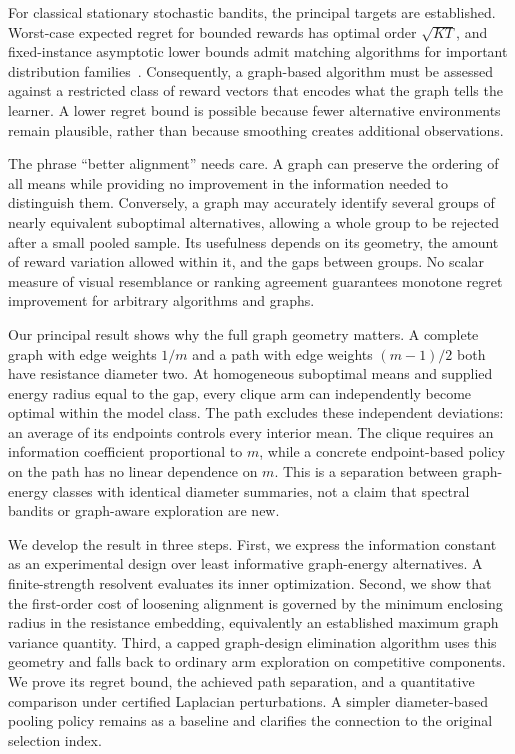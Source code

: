 \documentclass[11pt]{article}
\begin{document}
For classical stationary stochastic bandits, the principal targets are established. Worst-case expected regret for bounded rewards has optimal order $\sqrt{KT}$, and fixed-instance asymptotic lower bounds admit matching algorithms for important distribution families~\cite{audibert2010,garivier2011,lattimore2020}. Consequently, a graph-based algorithm must be assessed against a restricted class of reward vectors that encodes what the graph tells the learner. A lower regret bound is possible because fewer alternative environments remain plausible, rather than because smoothing creates additional observations.

The phrase ``better alignment'' needs care. A graph can preserve the ordering of all means while providing no improvement in the information needed to distinguish them. Conversely, a graph may accurately identify several groups of nearly equivalent suboptimal alternatives, allowing a whole group to be rejected after a small pooled sample. Its usefulness depends on its geometry, the amount of reward variation allowed within it, and the gaps between groups. No scalar measure of visual resemblance or ranking agreement guarantees monotone regret improvement for arbitrary algorithms and graphs.

Our principal result shows why the full graph geometry matters. A complete graph with edge weights $1/m$ and a path with edge weights $(m-1)/2$ both have resistance diameter two. At homogeneous suboptimal means and supplied energy radius equal to the gap, every clique arm can independently become optimal within the model class. The path excludes these independent deviations: an average of its endpoints controls every interior mean. The clique requires an information coefficient proportional to $m$, while a concrete endpoint-based policy on the path has no linear dependence on $m$. This is a separation between graph-energy classes with identical diameter summaries, not a claim that spectral bandits or graph-aware exploration are new.

We develop the result in three steps. First, we express the information constant as an experimental design over least informative graph-energy alternatives. A finite-strength resolvent evaluates its inner optimization. Second, we show that the first-order cost of loosening alignment is governed by the minimum enclosing radius in the resistance embedding, equivalently an established maximum graph variance quantity. Third, a capped graph-design elimination algorithm uses this geometry and falls back to ordinary arm exploration on competitive components. We prove its regret bound, the achieved path separation, and a quantitative comparison under certified Laplacian perturbations. A simpler diameter-based pooling policy remains as a baseline and clarifies the connection to the original selection index.
\end{document}
